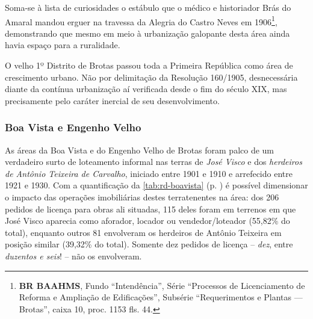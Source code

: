 Soma-se à lista de curiosidades o estábulo que o médico e historiador Brás do Amaral mandou erguer na travessa da Alegria do Castro Neves em 1906\footnote{\textbf{BR BAAHMS}, Fundo ``Intendência'', Série ``Processos de Licenciamento de Reforma e Ampliação de Edificações'', Subsérie ``Requerimentos e Plantas --- Brotas'', caixa 10, proc. 1153 fls. 44.}, demonstrando que mesmo em meio à urbanização galopante desta área ainda havia espaço para a ruralidade.


O velho 1º Distrito de Brotas passou toda a Primeira República como área de crescimento urbano. Não por delimitação da Resolução 160/1905, desnecessária diante da contínua urbanização aí verificada desde o fim do século XIX, mas precisamente pelo caráter inercial de seu desenvolvimento. 

\subsubsection{Boa Vista e Engenho Velho}


As áreas da Boa Vista e do Engenho Velho de Brotas foram palco de um verdadeiro surto de loteamento informal nas terras de \textit{José Visco} e dos \textit{herdeiros de Antônio Teixeira de Carvalho}, iniciado entre 1901 e 1910 e arrefecido entre 1921 e 1930. Com a quantificação da \autoref{tab:rd-boavista} (p. \pageref{tab:rd-boavista}) é possível dimensionar o impacto das operações imobiliárias destes terratenentes na área: dos 206 pedidos de licença para obras ali situadas, 115 deles foram em terrenos em que José Visco aparecia como aforador, locador ou vendedor/loteador (55,82\% do total), enquanto outros 81 envolveram os herdeiros de Antônio Teixeira em posição similar (39,32\% do total). Somente dez pedidos de licença – \textit{dez}, entre \textit{duzentos e seis}! – não os envolveram.




